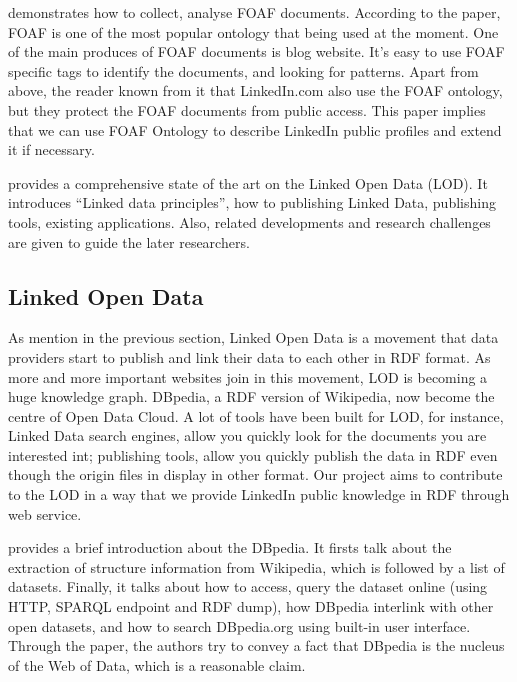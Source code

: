 \cite{ding2005} demonstrates how to collect, analyse FOAF documents. According to the paper, FOAF is one of the most popular ontology that being used at the moment. One of the main produces of FOAF documents is blog website. It's easy to use FOAF specific tags to identify the documents, and looking for patterns. Apart from above, the reader known from it that LinkedIn.com also use the FOAF ontology, but they protect the FOAF documents from public access. This paper implies that we can use FOAF Ontology to describe LinkedIn public profiles and extend it if necessary. 

\cite{bizer2009} provides a comprehensive state of the art on the Linked Open Data (LOD). It introduces ``Linked data principles'', how to publishing Linked Data, publishing tools, existing applications. Also, related developments and research challenges are given to guide the later researchers.

\subsection{Linked Open Data}

As mention in the previous section, Linked Open Data is a movement that data providers start to publish and link their data to each other in RDF format. As more and more important websites join in this movement, LOD is becoming a huge knowledge graph. DBpedia, a RDF version of Wikipedia, now become the centre of Open Data Cloud. A lot of tools have been built for LOD\cite{bizer2009}, for instance, Linked Data search engines, allow you quickly look for the documents you are interested int; publishing tools, allow you quickly publish the data in RDF even though the origin files in display in other format. Our project aims to contribute to the LOD in a way  that we provide LinkedIn public knowledge in RDF through web service.

\cite{auer2007} provides a brief introduction about the DBpedia. It firsts talk about the extraction of structure information from Wikipedia, which is followed by a list of datasets. Finally, it talks about how to access, query the dataset online (using HTTP, SPARQL endpoint and RDF dump), how DBpedia interlink with other open datasets, and how to search DBpedia.org using built-in user interface. Through the paper, the authors try to convey a fact that DBpedia is the nucleus of the Web of Data, which is a reasonable claim.

